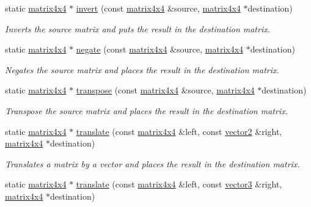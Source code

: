 \begin{DoxyCompactItemize}
static \hyperlink{classflounder_1_1matrix4x4}{matrix4x4} $\ast$ \hyperlink{classflounder_1_1matrix4x4_a37ca0be43e7f10e09c7c7b4b7e161221}{invert} (const \hyperlink{classflounder_1_1matrix4x4}{matrix4x4} \&source, \hyperlink{classflounder_1_1matrix4x4}{matrix4x4} $\ast$destination)
\begin{DoxyCompactList}\small\item\em Inverts the source matrix and puts the result in the destination matrix. \end{DoxyCompactList}\item 
static \hyperlink{classflounder_1_1matrix4x4}{matrix4x4} $\ast$ \hyperlink{classflounder_1_1matrix4x4_a80dc993f606da9821e1c25b5e3da8b4b}{negate} (const \hyperlink{classflounder_1_1matrix4x4}{matrix4x4} \&source, \hyperlink{classflounder_1_1matrix4x4}{matrix4x4} $\ast$destination)
\begin{DoxyCompactList}\small\item\em Negates the source matrix and places the result in the destination matrix. \end{DoxyCompactList}\item 
static \hyperlink{classflounder_1_1matrix4x4}{matrix4x4} $\ast$ \hyperlink{classflounder_1_1matrix4x4_a8981485705d5383e78d47015617dc9ee}{transpose} (const \hyperlink{classflounder_1_1matrix4x4}{matrix4x4} \&source, \hyperlink{classflounder_1_1matrix4x4}{matrix4x4} $\ast$destination)
\begin{DoxyCompactList}\small\item\em Transpose the source matrix and places the result in the destination matrix. \end{DoxyCompactList}\item 
static \hyperlink{classflounder_1_1matrix4x4}{matrix4x4} $\ast$ \hyperlink{classflounder_1_1matrix4x4_abaf0f6c7678192584177a8778e3f29ab}{translate} (const \hyperlink{classflounder_1_1matrix4x4}{matrix4x4} \&left, const \hyperlink{classflounder_1_1vector2}{vector2} \&right, \hyperlink{classflounder_1_1matrix4x4}{matrix4x4} $\ast$destination)
\begin{DoxyCompactList}\small\item\em Translates a matrix by a vector and places the result in the destination matrix. \end{DoxyCompactList}\item 
static \hyperlink{classflounder_1_1matrix4x4}{matrix4x4} $\ast$ \hyperlink{classflounder_1_1matrix4x4_a454168535e88cdfffb8a54a8858a28cf}{translate} (const \hyperlink{classflounder_1_1matrix4x4}{matrix4x4} \&left, const \hyperlink{classflounder_1_1vector3}{vector3} \&right, \hyperlink{classflounder_1_1matrix4x4}{matrix4x4} $\ast$destination)

\end{DoxyCompactItemize}
